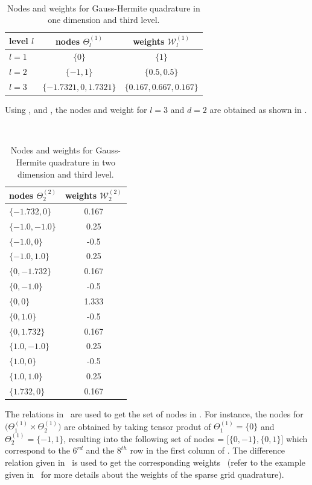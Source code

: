 \documentclass[letter,1p,11pt,oneside,onecolumn,sort&compress]{elsarticle}
\begin{document}
\

\begin{table}[htbp]
\centering
\begin{tabular}{|l|c|c|}   %
\hline
level $l$    & nodes $\Theta_l^{(1)}$  & weights $\mathcal{W}_l^{(1)}$\\
\hline
$l=1$      & $\{0 \}$   & $\{ 1 \}$       \\
$l=2$      & $\{-1,  1\}$   & $\{0.5, 0.5\}$       \\
$l=3$      & $\{ -1.7321, 0, 1.7321 \}$ & $\{ 0.167, 0.667, 0.167 \}$       \\
\hline
\end{tabular}
\caption{Nodes and weights for Gauss-Hermite quadrature in one dimension and third level.}
\label{table:sparseGrid}
\end{table}

Using ,  and , the nodes and weight for $l=3$ and $d=2$ are obtained as shown in .

\

\begin{table}[htbp]
\centering
\begin{tabular}{|l|c|}   %
\hline
nodes $\Theta_2^{(2)}$  & weights $\mathcal{W}_2^{(2)}$ \\
\hline
$\{ -1.732, 	0 \}$ & 0.167\\
$\{ -1.0, 	-1.0\}$ & 0.25 \\
$\{ -1.0, 	0 \}$& -0.5 \\
$\{ -1.0,  1.0\}$ & 0.25 \\
$\{ 0,	 -1.732 \}$& 0.167 \\
$\{ 0,	 -1.0\}$ & -0.5 \\
$\{ 0,	 0 \}$& 1.333 \\
$\{ 0, 1.0 \}$& -0.5 \\
$\{ 0,	 1.732\}$ & 0.167 \\
$\{1.0, 	-1.0 \}$& 0.25 \\
$\{1.0, 	0  \}$& -0.5 \\
$\{1.0, 	1.0\}$ & 0.25 \\
$\{1.732, 	0 \}$& 0.167\\
\hline
\end{tabular}
\caption{Nodes and weights for Gauss-Hermite quadrature in two dimension and third level.}
\label{table:l2d2sparseGrid}
\end{table}

\newpage
The relations in~ are used to get the set of nodes in . For instance, the nodes for $\big( \Theta_1^{(1)}  \times \Theta_2^{(1)} \big)$ are obtained by taking tensor produt of $\Theta_1^{(1)} = \{ 0 \}$ and $\Theta_2^{(1)} = \{ -1, 1 \}$, resulting into the following set of nodes = $\big[ \{0, -1\}, \{0, 1\} \big]$ which correspond to the $6^{rd}$ and the $8^{th}$ row in the first column of . The difference relation given in~ is used to get the corresponding weights~\cite{smith2013uncertainty} (refer to the example given in~ for more details about the weights of the sparse grid quadrature).
\end{document}
